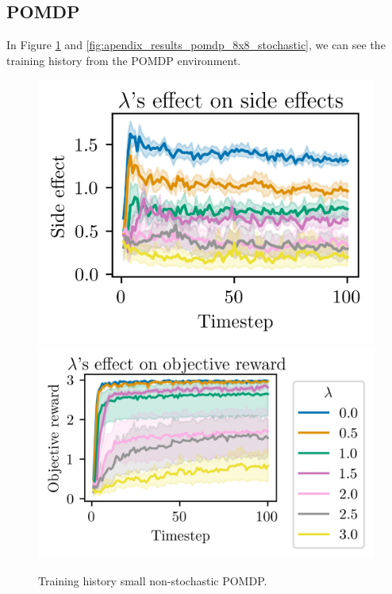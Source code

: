 \documentclass[12pt,A4]{report}
\theoremstyle{definition}
\begin{document}
\begin{appendices}
\section{POMDP}
  In Figure \ref{fig:apendix_results_pomdp_8x8} and \ref{fig:apendix_results_pomdp_8x8_stochastic}, we can see the training history from the POMDP environment.
\begin{figure}[H]
  \centering
  \includegraphics{"./figures/pomdp_8x8_side_effects.png"}
  \includegraphics{"./figures/pomdp_8x8_objective_reward.png"}
  \caption{Training history small non-stochastic POMDP.}
  \label{fig:apendix_results_pomdp_8x8}
\end{figure}


\end{appendices}
\end{document}
